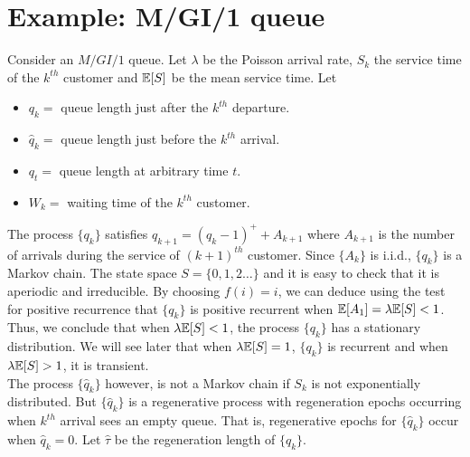 \documentclass[all-lectures.tex]{subfiles}
\begin{document}

\setcounter{section}{5}
\setcounter{subsection}{0}

\section*{}
\section{Example: M/GI/1 queue}
Consider an $M/GI/1$ queue. Let $\lambda$  be the Poisson arrival rate, $S_k$ the service time of the $k^{th}$ customer and $\mathbb{E}[S]$ be the mean service time. Let 
\begin{itemize}
\item $q_k = $ queue length just after the $k^{th}$ departure. 
\item $\hat{q}_k = $ queue length just before the $k^{th}$ arrival. 
\item $q_t =$ queue length at arbitrary time $t$.
\item $W_k = $ waiting time of the $k^{th}$ customer.
\end{itemize}
The process $\{q_k\}$ satisfies $q_{k+1} = (q_k -1)^+ + A_{k+1}$ where $A_{k+1}$ is the number of arrivals during the service of $(k+1)^{th}$ customer. Since $\{A_k\}$ is i.i.d., $\{q_k\}$ is a Markov chain. The state space $S = \{0,1,2\dots\}$ and it is easy to check that it is aperiodic and irreducible. By choosing $f(i) = i$, we can deduce using the test for positive recurrence that $\{q_k\}$ is positive recurrent when $\mathbb{E}[A_1] = \lambda \mathbb{E}[S] < 1$. Thus, we conclude that when $\lambda \mathbb{E}[S] < 1$, the process $\{q_k\}$ has a stationary distribution. We will  see later that when $\lambda\mathbb{E}[S] = 1$, $\{q_k\}$ is recurrent and when $\lambda \mathbb{E}[S] > 1$, it is transient. \\
\indent  The process $\{\hat{q}_k\}$ however, is not a Markov chain if $S_k$ is not exponentially distributed. But $\{\hat{q}_k\}$ is a regenerative process with regeneration epochs occurring when $k^{th}$ arrival sees an empty queue. That is, regenerative epochs for $\{\hat{q}_k\}$ occur when $ \hat{q}_k = 0$. Let $\hat{\tau}$ be the regeneration length of $\{\hat{q}_k\}$. \\
\end{document}
